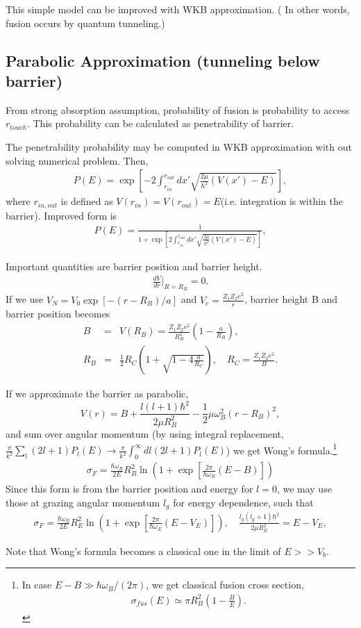 \documentclass[11pt]{book}
\newcommand{\bea}{\begin{eqnarray}}
\newcommand{\eea}{\end{eqnarray}}
\newcommand{\no}{\nonumber \\}
\begin{document}
This simple model can be improved with WKB approximation. (
In other words, fusion occurs by quantum tunneling.)

\subsection{Parabolic Approximation (tunneling below barrier)}

From strong absorption assumption, 
probability of fusion is probability to access $r_{touch}$. 
This probability can be calculated as penetrability of barrier. 

The penetrability probability may be computed in WKB approximation
with out solving numerical problem. Then,
\bea 
P(E)=\exp\left[-2\int_{r_{in}}^{r_{out}} dx' \sqrt{\frac{2\mu}{\hbar^2}(V(x')-E)}\right],
\eea  
where $r_{in,out}$ is defined as $V(r_{in})=V(r_{out})=E$(i.e. integration
is within the barrier). Improved form is
\bea 
P(E)=\frac{1}{1+\exp\left[2\int_{r_{in}}^{r_{out}} dx' \sqrt{\frac{2\mu}{\hbar^2}(V(x')-E)}\right]},
\eea  

Important quantities are barrier position and barrier height.
\bea 
\frac{dV}{dr}|_{R=R_B}=0.
\eea 
If we use $V_N=V_0\exp[-(r-R_B)/a]$ and $V_c=\frac{Z_1Z_2 e^2}{r}$, barrier
height B and barrier position becomes
\bea 
B&=&V(R_B)=\frac{Z_1 Z_2 e^2}{R_B^2}\left(1-\frac{a}{R_B}\right),\no 
R_B&=&\frac{1}{2}R_C\left(1+\sqrt{1-4\frac{a}{R_C}}\right),\quad
  R_C=\frac{Z_1 Z_2 e^2}{B}.
\eea 



If we approximate the barrier as parabolic,
$$ V(r)=B+\frac{l(l+1)\hbar^2}{2\mu R_B^2}-\frac{1}{2}\mu\omega_B^2(r-R_B)^2,
$$
 and sum over angular momentum (by using integral replacement,
 $\frac{\pi}{k^2}\sum_l(2l+1)P_l(E)\to \frac{\pi}{k^2}\int_0^\infty dl (2l+1)P_l(E)$)
we get Wong's formula.\footnote{
In case $E-B\gg \hbar \omega_B/(2\pi)$, we get classical fusion cross section,
\bea 
\sigma_{fus}(E)\simeq \pi R_B^2\left(1-\frac{B}{E}\right). 
\eea 
}  
\bea 
\sigma_F=\frac{\hbar\omega_B}{2E} R_B^2 \ln\left(1+\exp\left[\frac{2\pi}{\hbar\omega_B}(E-B)\right]
 \right) 
\eea 
Since this form is from the barrier position and energy for $l=0$,
we may use those at grazing angular momentum $l_g$ for energy dependence,
such that
\bea 
\sigma_F=\frac{\hbar\omega_E}{2E} R_E^2 \ln\left(1+\exp\left[\frac{2\pi}{\hbar\omega_E}(E-V_E)\right]
 \right),\quad  \frac{l_g(l_g+1)\hbar^2}{2\mu R_E^2}=E-V_E,
\eea 

Note that Wong's formula becomes a classical one in the limit of $E>> V_b$. 
\end{document}
